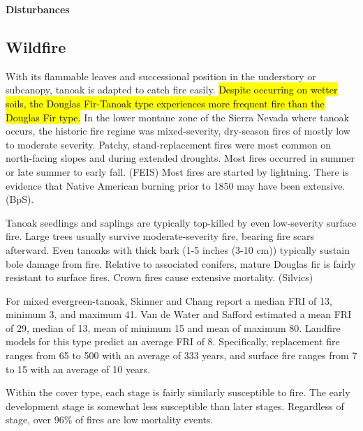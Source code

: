 \documentclass{article}
\begin{document}
\begin{snugshade}\Large \textbf{Disturbances} \end{snugshade}

\subsection*{Wildfire}

With its flammable leaves and successional position in the understory or subcanopy, tanoak is adapted to catch fire easily. \hl{Despite occurring on wetter soils, the Douglas Fir-Tanoak type experiences more frequent fire than the Douglas Fir type.} In the lower montane zone of the Sierra Nevada where tanoak occurs, the historic fire regime was mixed-severity, dry-season fires of mostly low to moderate severity. Patchy, stand-replacement fires were most common on north-facing slopes and during extended droughts. Most fires occurred in summer or late summer to early fall. (FEIS) Most fires are started by lightning. There is evidence that Native American burning prior to 1850 may have been extensive. (BpS).

Tanoak seedlings and saplings are typically top-killed by even low-severity surface fire. Large trees usually survive moderate-severity fire, bearing fire scars afterward. Even tanoaks with thick bark (1-5 inches (3-10 cm)) typically sustain bole damage from fire. Relative to associated conifers, mature Douglas fir is fairly resistant to surface fires. Crown fires cause extensive mortality. (Silvics)

For mixed evergreen-tanoak, Skinner and Chang report a median FRI of 13, minimum 3, and maximum 41. Van de Water and Safford estimated a mean FRI of 29, median of 13, mean of minimum 15 and mean of maximum 80. Landfire models for this type predict an average FRI of 8. Specifically, replacement fire ranges from 65 to 500 with an average of 333 years, and surface fire ranges from 7 to 15 with an average of 10 years.

Within the cover type, each stage is fairly similarly susceptible to fire. The early development stage is somewhat less susceptible than later stages. Regardless of stage, over 96\% of fires are low mortality events.
\end{document}
